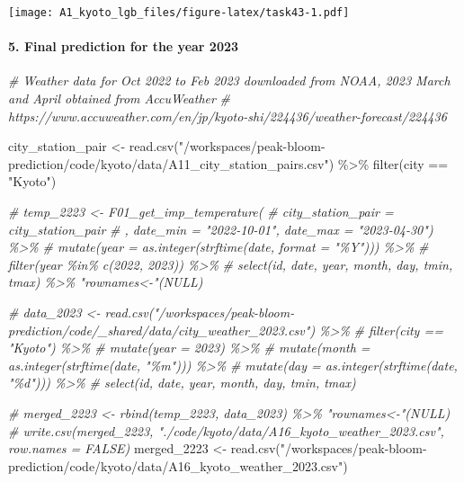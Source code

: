 \documentclass[
]{article}
\newenvironment{Shaded}{\begin{snugshade}}{\end{snugshade}}
\newcommand{\CommentTok}[1]{\textcolor[rgb]{0.56,0.35,0.01}{\textit{#1}}}
\newcommand{\FunctionTok}[1]{\textcolor[rgb]{0.00,0.00,0.00}{#1}}
\newcommand{\NormalTok}[1]{#1}
\newcommand{\OtherTok}[1]{\textcolor[rgb]{0.56,0.35,0.01}{#1}}
\newcommand{\SpecialCharTok}[1]{\textcolor[rgb]{0.00,0.00,0.00}{#1}}
\newcommand{\StringTok}[1]{\textcolor[rgb]{0.31,0.60,0.02}{#1}}
\begin{document}
\texttt{[image: A1\_kyoto\_lgb\_files/figure-latex/task43-1.pdf]}

\newpage

\hypertarget{final-prediction-for-the-year-2023}{%
\paragraph{5. Final prediction for the year
2023}\label{final-prediction-for-the-year-2023}}

\begin{Shaded}
\begin{Highlighting}[]
\CommentTok{\# Weather data for Oct 2022 to Feb 2023 downloaded from NOAA, 2023 March and April obtained from AccuWeather}
\CommentTok{\# https://www.accuweather.com/en/jp/kyoto{-}shi/224436/weather{-}forecast/224436}

\NormalTok{city\_station\_pair }\OtherTok{\textless{}{-}} \FunctionTok{read.csv}\NormalTok{(}\StringTok{"/workspaces/peak{-}bloom{-}prediction/code/kyoto/data/A11\_city\_station\_pairs.csv"}\NormalTok{) }\SpecialCharTok{\%\textgreater{}\%} \FunctionTok{filter}\NormalTok{(city }\SpecialCharTok{==} \StringTok{"Kyoto"}\NormalTok{)}

\CommentTok{\# temp\_2223 \textless{}{-} F01\_get\_imp\_temperature(}
\CommentTok{\#     city\_station\_pair = city\_station\_pair}
\CommentTok{\#     , date\_min = "2022{-}10{-}01", date\_max = "2023{-}04{-}30") \%\textgreater{}\% }
\CommentTok{\#     mutate(year = as.integer(strftime(date, format = "\%Y"))) \%\textgreater{}\%}
\CommentTok{\#     filter(year \%in\% c(2022, 2023)) \%\textgreater{}\%}
\CommentTok{\#     select(id, date, year, month, day, tmin, tmax) \%\textgreater{}\% "rownames\textless{}{-}"(NULL)}

\CommentTok{\# data\_2023 \textless{}{-} read.csv("/workspaces/peak{-}bloom{-}prediction/code/\_shared/data/city\_weather\_2023.csv") \%\textgreater{}\%}
\CommentTok{\#     filter(city == "Kyoto") \%\textgreater{}\%}
\CommentTok{\#     mutate(year = 2023) \%\textgreater{}\%}
\CommentTok{\#     mutate(month = as.integer(strftime(date, "\%m"))) \%\textgreater{}\%}
\CommentTok{\#     mutate(day = as.integer(strftime(date, "\%d"))) \%\textgreater{}\%}
\CommentTok{\#     select(id, date, year, month, day, tmin, tmax)}

\CommentTok{\# merged\_2223 \textless{}{-} rbind(temp\_2223, data\_2023) \%\textgreater{}\% "rownames\textless{}{-}"(NULL)}
\CommentTok{\# write.csv(merged\_2223, "./code/kyoto/data/A16\_kyoto\_weather\_2023.csv", row.names = FALSE)}
\NormalTok{merged\_2223 }\OtherTok{\textless{}{-}} \FunctionTok{read.csv}\NormalTok{(}\StringTok{"/workspaces/peak{-}bloom{-}prediction/code/kyoto/data/A16\_kyoto\_weather\_2023.csv"}\NormalTok{)}


\end{Highlighting}
\end{Shaded}
\end{document}
